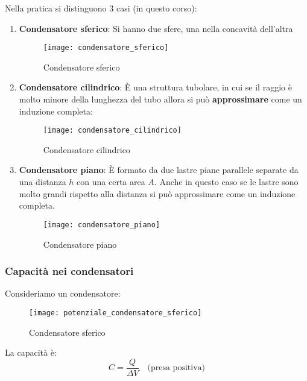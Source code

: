\documentclass[a4paper]{article}
\begin{document}
\vspace{1em}
\noindent
Nella pratica si distinguono 3 casi (in questo corso):
\begin{enumerate}
  \item \textbf{Condensatore sferico}: Si hanno due sfere, una nella concavità 
    dell'altra
    \begin{figure}[H]
      \centering
      \texttt{[image: condensatore\_sferico]}
      \caption{Condensatore sferico}
    \end{figure}

  \item \textbf{Condensatore cilindrico}: È una struttura tubolare, in cui
    se il raggio è molto minore della lunghezza del tubo allora si può \textbf{approssimare}
    come un induzione completa:
    \begin{figure}[H]
      \centering
      \texttt{[image: condensatore\_cilindrico]}
      \caption{Condensatore cilindrico}
    \end{figure}

  \item \textbf{Condensatore piano}: È formato da due lastre piane parallele
    separate da una distanza \( h \) con una certa area \( A \). Anche in questo
    caso se le lastre sono molto grandi rispetto alla distanza si può approssimare
    come un induzione completa.
    \begin{figure}[H]
      \centering
      \texttt{[image: condensatore\_piano]}
      \caption{Condensatore piano}
    \end{figure}
\end{enumerate}

\subsubsection{Capacità nei condensatori}
Consideriamo un condensatore:
\begin{figure}[H]
  \centering
  \texttt{[image: potenziale\_condensatore\_sferico]}
  \caption{Condensatore sferico}
\end{figure}
\noindent
La capacità è:
\[
  C = \frac{Q}{\Delta V} \quad \text{(presa positiva)}
\] 
\end{document}
